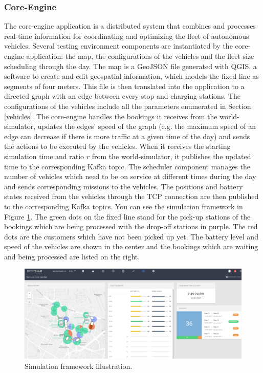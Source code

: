 \documentclass[12pt,a4paper]{article}
\begin{document}
\subsubsection{Core-Engine}
The core-engine application is a distributed system that combines and processes real-time information for coordinating and optimizing the fleet of autonomous vehicles. Several testing environment components are instantiated by the core-engine application: the map, the configurations of the vehicles and the fleet size scheduling through the day. The map is a GeoJSON file generated with QGIS, a software to create and edit geospatial information, which models the fixed line as segments of four meters. This file is then translated into the application to a directed graph with an edge between every stop and charging stations. The configurations of the vehicles include all the parameters enumerated in Section \ref{vehicles}. The core-engine handles the bookings it receives from the world-simulator, updates the edges' speed of the graph (e.g. the maximum speed of an edge can decrease if there is more traffic at a given time of the day) and sends the actions to be executed by the vehicles. When it receives the starting simulation time and ratio $r$ from the world-simulator, it publishes the updated time to the corresponding Kafka topic. The scheduler component manages the number of vehicles which need to be on service at different times during the day and sends corresponding missions to the vehicles. The positions and battery states received from the vehicles through the TCP connection are then published to the corresponding Kafka topics. You can see the simulation framework in Figure \ref{fig:simu}. The green dots on the fixed line stand for the pick-up stations of the bookings which are being processed with the drop-off stations in purple. The red dots are the customers which have not been picked up yet. The battery level and speed of the vehicles are shown in the center and the bookings which are waiting and being processed are listed on the right.

\begin{figure} 
  \centering
\includegraphics[width=\textwidth]{./images/coreengine}
\caption{Simulation framework illustration.}
\label{fig:simu}
\end{figure}
\end{document}
